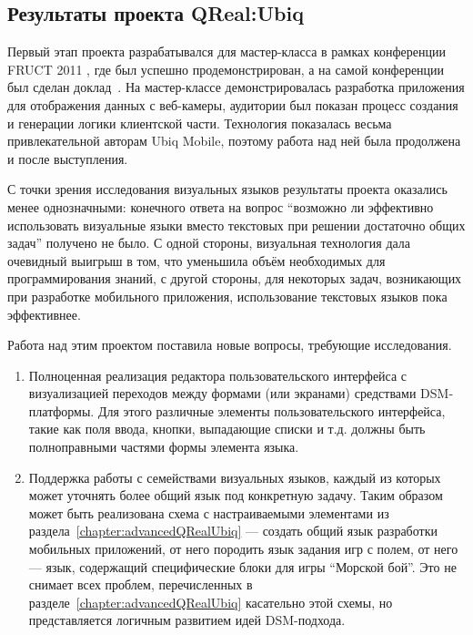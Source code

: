 \subsection{Результаты проекта QReal:Ubiq}
Первый этап проекта разрабатывался для мастер-класса в рамках конференции FRUCT 2011%
, где был успешно продемонстрирован, а на самой конференции был сделан доклад~\cite{bryksin2011ubiq}. 
На мастер-классе демонстрировалась разработка приложения для отображения данных 
с веб-камеры, аудитории был показан процесс создания и генерации логики клиентской 
части. Технология показалась весьма привлекательной авторам Ubiq Mobile, поэтому работа 
над ней была продолжена и после выступления.

С точки зрения исследования визуальных языков результаты проекта оказались менее однозначными: 
конечного ответа на вопрос "`возможно ли эффективно использовать визуальные языки 
вместо текстовых при решении достаточно общих задач"' получено не было. С одной стороны, 
визуальная технология дала очевидный выигрыш в том, что уменьшила объём необходимых 
для программирования знаний, с другой стороны, для некоторых задач, возникающих при 
разработке мобильного приложения, использование текстовых языков пока эффективнее. 

Работа над этим проектом поставила новые вопросы, требующие исследования. 
\begin{enumerate}
	\item Полноценная реализация редактора пользовательского интерфейса с визуализацией 
		переходов между формами (или экранами) средствами DSM-платформы. Для этого различные 
		элементы пользовательского интерфейса, такие как поля ввода, кнопки, выпадающие 
		списки и т.д. должны быть полноправными частями формы элемента языка.
	\item Поддержка работы с семействами визуальных языков, каждый из которых может 
		уточнять более общий язык под конкретную задачу. Таким образом может быть реализована 
		схема с настраиваемыми элементами из раздела~\ref{chapter:advancedQRealUbiq} --- 
		создать общий язык разработки мобильных приложений, от него породить язык задания 
		игр с полем, от него --- язык, содержащий специфические блоки для игры "`Морской бой"'. 
		Это не снимает всех проблем, перечисленных в разделе~\ref{chapter:advancedQRealUbiq} 
		касательно этой схемы, но представляется логичным развитием идей DSM-подхода.
\end{enumerate}